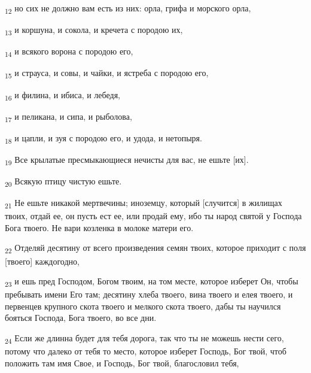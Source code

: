 \begin{tcolorbox}
\textsubscript{12} но сих не должно вам есть из них: орла, грифа и морского орла,
\end{tcolorbox}
\begin{tcolorbox}
\textsubscript{13} и коршуна, и сокола, и кречета с породою их,
\end{tcolorbox}
\begin{tcolorbox}
\textsubscript{14} и всякого ворона с породою его,
\end{tcolorbox}
\begin{tcolorbox}
\textsubscript{15} и страуса, и совы, и чайки, и ястреба с породою его,
\end{tcolorbox}
\begin{tcolorbox}
\textsubscript{16} и филина, и ибиса, и лебедя,
\end{tcolorbox}
\begin{tcolorbox}
\textsubscript{17} и пеликана, и сипа, и рыболова,
\end{tcolorbox}
\begin{tcolorbox}
\textsubscript{18} и цапли, и зуя с породою его, и удода, и нетопыря.
\end{tcolorbox}
\begin{tcolorbox}
\textsubscript{19} Все крылатые пресмыкающиеся нечисты для вас, не ешьте [их].
\end{tcolorbox}
\begin{tcolorbox}
\textsubscript{20} Всякую птицу чистую ешьте.
\end{tcolorbox}
\begin{tcolorbox}
\textsubscript{21} Не ешьте никакой мертвечины; иноземцу, который [случится] в жилищах твоих, отдай ее, он пусть ест ее, или продай ему, ибо ты народ святой у Господа Бога твоего. Не вари козленка в молоке матери его.
\end{tcolorbox}
\begin{tcolorbox}
\textsubscript{22} Отделяй десятину от всего произведения семян твоих, которое приходит с поля [твоего] каждогодно,
\end{tcolorbox}
\begin{tcolorbox}
\textsubscript{23} и ешь пред Господом, Богом твоим, на том месте, которое изберет Он, чтобы пребывать имени Его там; десятину хлеба твоего, вина твоего и елея твоего, и первенцев крупного скота твоего и мелкого скота твоего, дабы ты научился бояться Господа, Бога твоего, во все дни.
\end{tcolorbox}
\begin{tcolorbox}
\textsubscript{24} Если же длинна будет для тебя дорога, так что ты не можешь нести сего, потому что далеко от тебя то место, которое изберет Господь, Бог твой, чтоб положить там имя Свое, и Господь, Бог твой, благословил тебя,
\end{tcolorbox}
